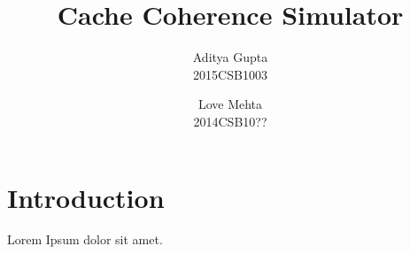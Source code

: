\documentclass{article}
\title{Cache Coherence Simulator}
\author{Aditya Gupta\\2015CSB1003 \and Love Mehta\\2014CSB10??}
\begin{document}
\maketitle
\section{Introduction}
Lorem Ipsum dolor sit amet.
\end{document}
